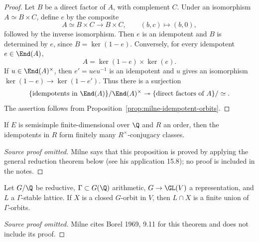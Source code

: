 \begin{proof}
Let $B$ be a direct factor of $A$, with complement $C$.  Under an isomorphism
$A\simeq B\times C$, define $e$ by the composite
\[
A\simeq B\times C\longrightarrow B\times C,
\qquad (b,c)\longmapsto(b,0),
\]
followed by the inverse isomorphism.  Then $e$ is an idempotent and $B$ is
determined by $e$, since $B=\ker(1-e)$.  Conversely, for every idempotent
$e\in\End(A)$,
\[
A=\ker(1-e)\times\ker(e).
\]
If $u\in\End(A)^\times$, then $e'=ueu^{-1}$ is an idempotent and $u$ gives
an isomorphism $\ker(1-e)\to\ker(1-e')$.  Thus there is a surjection
\[
\{\text{idempotents in }\End(A)\}/\End(A)^\times
\twoheadrightarrow
\{\text{direct factors of }A\}/\simeq.
\]
The assertion follows from Proposition~\ref{prop:milne-idempotent-orbits}.
\end{proof}

\begin{proposition}\label{prop:milne-idempotent-orbits}
If $E$ is semisimple finite-dimensional over $\Q$ and $R$ an order, then the idempotents in $R$ form finitely many $R^\times$-conjugacy classes.
\end{proposition}
\begin{proof}[Source proof omitted]
Milne says that this proposition is proved by applying the general reduction
theorem below (see his application 15.8); no proof is included in the notes.
\end{proof}
\begin{theorem}\label{thm:milne-bhc-orbit}
Let $G/\Q$ be reductive, $\Gamma\subset G(\Q)$ arithmetic, $G\to\GL(V)$ a representation, and $L$ a $\Gamma$-stable lattice. If $X$ is a closed $G$-orbit in $V$, then $L\cap X$ is a finite union of $\Gamma$-orbits.
\end{theorem}
\begin{proof}[Source proof omitted]
Milne cites Borel 1969, 9.11 for this theorem and does not include its proof.
\end{proof}
